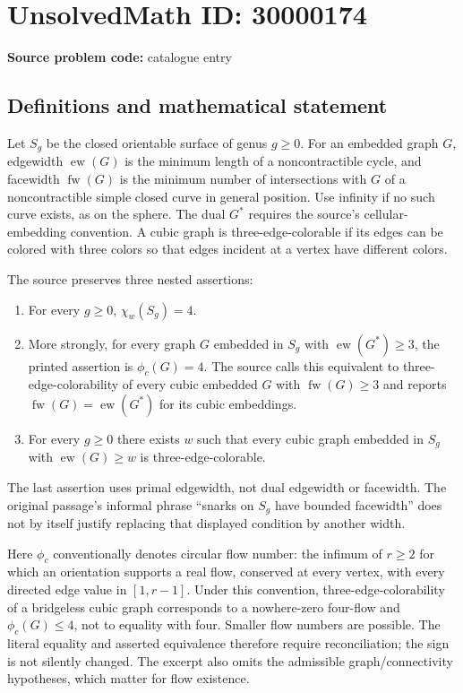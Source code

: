 \documentclass[11pt]{article}
\begin{document}
\section*{UnsolvedMath ID: 30000174}
\textbf{Source problem code:} catalogue entry
\subsection{Definitions and mathematical statement}
Let $S_g$ be the closed orientable surface of genus $g\ge0$. For an embedded graph $G$, edgewidth $\operatorname{ew}(G)$ is the minimum length of a noncontractible cycle, and facewidth $\operatorname{fw}(G)$ is the minimum number of intersections with $G$ of a noncontractible simple closed curve in general position. Use infinity if no such curve exists, as on the sphere. The dual $G^*$ requires the source's cellular-embedding convention. A cubic graph is three-edge-colorable if its edges can be colored with three colors so that edges incident at a vertex have different colors.

The source preserves three nested assertions:
\begin{enumerate}
\item For every $g\ge0$, $\chi_w(S_g)=4$.
\item More strongly, for every graph $G$ embedded in $S_g$ with $\operatorname{ew}(G^*)\ge3$, the printed assertion is $\phi_c(G)=4$. The source calls this equivalent to three-edge-colorability of every cubic embedded $G$ with $\operatorname{fw}(G)\ge3$ and reports $\operatorname{fw}(G)=\operatorname{ew}(G^*)$ for its cubic embeddings.
\item For every $g\ge0$ there exists $w$ such that every cubic graph embedded in $S_g$ with $\operatorname{ew}(G)\ge w$ is three-edge-colorable.
\end{enumerate}
The last assertion uses primal edgewidth, not dual edgewidth or facewidth. The original passage's informal phrase ``snarks on $S_g$ have bounded facewidth'' does not by itself justify replacing that displayed condition by another width.

Here $\phi_c$ conventionally denotes circular flow number: the infimum of $r\ge2$ for which an orientation supports a real flow, conserved at every vertex, with every directed edge value in $[1,r-1]$. Under this convention, three-edge-colorability of a bridgeless cubic graph corresponds to a nowhere-zero four-flow and $\phi_c(G)\le4$, not to equality with four. Smaller flow numbers are possible. The literal equality and asserted equivalence therefore require reconciliation; the sign is not silently changed. The excerpt also omits the admissible graph/connectivity hypotheses, which matter for flow existence.
\end{document}
